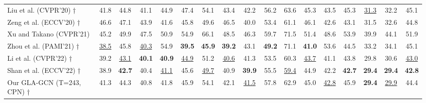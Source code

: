 \documentclass[10pt,twocolumn,letterpaper]{article}
\begin{document}
\begin{table*}[h]
{\begin{tabular}{lcccccccccccccccc}
Liu et al. \cite{RN013} (CVPR’20) † &  41.8  &  44.8  &  41.1  &  44.9  &  47.4  &  54.1  &  43.4  &  42.2  &  56.2  &  63.6  &  45.3  &  43.5  &  45.3  &  \underline{31.3}  &  32.2  &  45.1  \\
Zeng et al. \cite{zeng2020srnet} (ECCV’20) †  &  46.6  &  47.1  &  43.9  &  41.6  &  45.8  &  49.6  &  46.5  &  40.0  &  53.4  &  61.1  &  46.1  &  42.6  &  43.1  &  31.5  &  32.6  &  44.8  \\
Xu and Takano \cite{RN039} (CVPR’21)  &  45.2  &  49.9  &  47.5  &  50.9  &  54.9  &  66.1  &  48.5  &  46.3  &  59.7  &  71.5  &  51.4  &  48.6  &  53.9  &  39.9  &  44.1  &  51.9  \\
Zhou et al. \cite{RN040} (PAMI’21) †  & \underline{38.5}  &  45.8  &  \underline{40.3}  &  54.9  &  \textbf{39.5}  &  \textbf{45.9}  &  \textbf{39.2}  &  43.1  &  \textbf{49.2}  &  71.1  &  \textbf{41.0}  &  53.6  &  44.5  &  33.2  &  34.1  &  45.1  \\
Li et al. \cite{li2022mhformer} (CVPR’22) †    &  39.2  &  \underline{43.1}  &  \textbf{40.1}  &  \textbf{40.9}  &  \underline{44.9}  &  51.2  &  \underline{40.6}  &  41.3  &  53.5  &  60.3  &  \underline{43.7}  &  41.1  &  43.8  &  29.8  &  30.6  &  \underline{43.0}  \\
Shan et al. \cite{shan2022p} (ECCV’22) †  &  38.9  &  \textbf{42.7}  &  40.4  &  \underline{41.1}  &  45.6  &  \underline{49.7}  &  40.9  &  \textbf{39.9}  &  55.5  &  \underline{59.4}  &  44.9  &  42.2  &  \textbf{42.7}  &  \textbf{29.4}  &  \textbf{29.4}  &  \textbf{42.8}  \\

\rowcolor{grayrow}
Our GLA-GCN (T=243, CPN) †  &  41.3  &  44.3  &  40.8  &  41.8  &  45.9  &  54.1  &  42.1  &  \underline{41.5}  &  57.8  &  62.9  &  45.0  &  \underline{42.8}  &  45.9  &  \textbf{29.4}  &  \underline{29.9}  &  44.4  \\

\midrule\midrule


\end{tabular}}
\end{table*}
\end{document}
